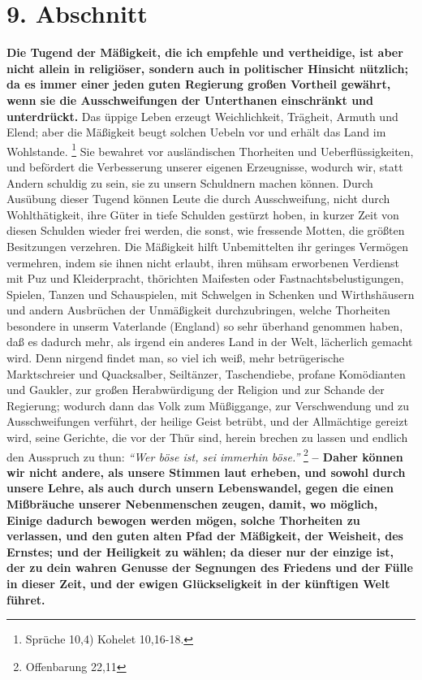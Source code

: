 \section{9. Abschnitt} \label{kap18_ab9}

\label{ref:18_09_gesellschaftlich} \textbf{Die Tugend der Mäßigkeit, die ich empfehle und vertheidige, ist aber nicht
allein in religiöser, sondern auch in politischer Hinsicht
nützlich; da es immer
einer jeden guten Regierung großen Vortheil gewährt, wenn sie die
Ausschweifungen der Unterthanen einschränkt und unterdrückt.} Das üppige Leben
erzeugt Weichlichkeit, Trägheit, Armuth und Elend;
aber die Mäßigkeit beugt
solchen Uebeln vor und erhält das Land im Wohlstande.
\footnote{Sprüche 10,4)
Kohelet 10,16-18.}
Sie bewahret vor ausländischen Thorheiten und
Ueberflüssigkeiten, und befördert die Verbesserung unserer eigenen Erzeugnisse,
wodurch wir, statt Andern schuldig zu sein, sie zu unsern Schuldnern machen
können. Durch Ausübung dieser Tugend können Leute die durch Ausschweifung, nicht
durch Wohlthätigkeit, ihre Güter in tiefe Schulden gestürzt hoben, in kurzer
Zeit von diesen Schulden wieder frei werden, die sonst, wie fressende Motten,
die größten Besitzungen verzehren. Die Mäßigkeit hilft Unbemittelten ihr
geringes Vermögen vermehren, indem sie ihnen nicht erlaubt, ihren mühsam
erworbenen Verdienst mit Puz und Kleiderpracht, thörichten Maifesten oder
Fastnachtsbelustigungen, Spielen, Tanzen und Schauspielen, mit
Schwelgen in
Schenken und Wirthshäusern und andern Ausbrüchen der
Unmäßigkeit durchzubringen,
welche Thorheiten besondere in unserm Vaterlande (England)
so sehr überhand
genommen haben, daß es dadurch mehr, als irgend ein anderes Land in der Welt,
lächerlich gemacht wird. Denn nirgend findet man, so viel ich weiß, mehr
betrügerische Marktschreier und Quacksalber, Seiltänzer,
Taschendiebe, profane
Komödianten und Gaukler, zur großen Herabwürdigung der Religion
und zur Schande
der Regierung; wodurch dann das Volk zum Müßiggange, zur
Verschwendung und zu
Ausschweifungen verführt, der heilige Geist betrübt, und der Allmächtige gereizt
wird, seine Gerichte, die vor der Thür sind, herein brechen zu lassen und
endlich den Ausspruch zu thun:
\textit{"`Wer böse ist, sei immerhin böse."'}
\footnote{Offenbarung 22,11}
 \label{ref:18_09_lautstark} \textbf{-- Daher
können wir nicht andere, als unsere
Stimmen laut erheben, und sowohl durch unsere Lehre, als auch durch unsern
Lebenswandel, gegen die einen Mißbräuche unserer Nebenmenschen zeugen, damit, wo
möglich, Einige dadurch bewogen werden mögen, solche Thorheiten zu verlassen,
und den guten alten Pfad der Mäßigkeit, der Weisheit, des Ernstes; und der
Heiligkeit zu wählen; da dieser nur der einzige ist, der zu dein wahren Genusse
der Segnungen des Friedens und der Fülle in dieser Zeit, und der ewigen
Glückseligkeit in der künftigen Welt führet.}

